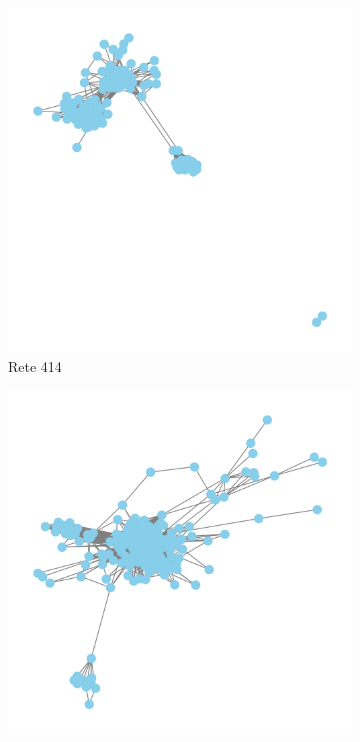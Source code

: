 \begin{figure}[htbp]
  \centering
  \begin{subfigure}[b]{0.4\textwidth}
    \centering
    \includegraphics[width=\textwidth]{images/414.png}
    \caption{Rete 414}
    \label{fig:sub1}
  \end{subfigure}
  \hfill
  \begin{subfigure}[b]{0.4\textwidth}
    \centering
    \includegraphics[width=\textwidth]{images/348.png}

\end{subfigure}
\end{figure}

